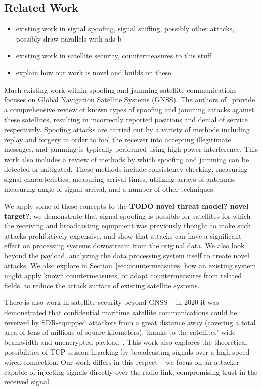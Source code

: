 \subsection{Related Work}

%
\begin{itemize}
    \item existing work in signal spoofing, signal sniffing, possibly other attacks, possibly draw parallels with ads-b
    \item existing work in satellite security, countermeasures to this stuff
    \item explain how our work is novel and builds on these
\end{itemize}

Much existing work within spoofing and jamming satellite communications focuses on Global Navigation Satellite Systems (GNSS).
The authors of~\cite{wuSpoofing2020} provide a comprehensive review of known types of spoofing and jamming attacks against these satellites, resulting in incorrectly reported positions and denial of service respectively.
Spoofing attacks are carried out by a variety of methods including replay and forgery in order to fool the receiver into accepting illegitimate messages, and jamming is typically performed using high-power interference.
This work also includes a review of methods by which spoofing and jamming can be detected or mitigated.
These methods include consistency checking, measuring signal characteristics, measuring arrival times, utilizing arrays of antennas, measuring angle of signal arrival, and a number of other techniques.

We apply some of these concepts to the \textbf{TODO novel threat model? novel target?}; we demonstrate that signal spoofing is possible for satellites for which the receiving and broadcasting equipment was previously thought to make such attacks prohibitively expensive, and show that attacks can have a significant effect on processing systems downstream from the original data.
We also look beyond the payload, analyzing the data processing system itself to create novel attacks.
We also explore in Section~\ref{sec:countermeasures} how an existing system might apply known countermeasures, or adapt countermeasures from related fields, to reduce the attack surface of existing satellite systems.

There is also work in satellite security beyond GNSS -- in 2020 it was demonstrated that confidential maritime satellite communications could be reveived by SDR-equipped attackers from a great distance away (covering a total area of tens of millions of square kilometers), thanks to the satellites' wide beamwidth and unencrypted payload~\cite{pavurTale2020}.
This work also explores the theoretical possibilities of TCP session hijacking by broadcasting signals over a high-speed wired connection.
Our work differs in this respect -- we focus on an attacker capable of injecting signals directly over the radio link, compromising trust in the received signal.

